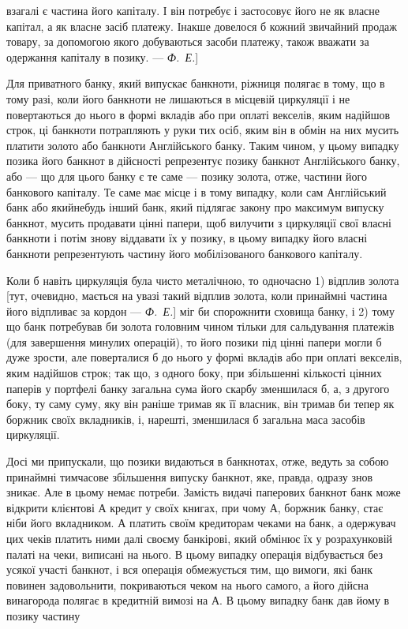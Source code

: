 \parcont{}  %
взагалі є частина його капіталу. І він потребує і застосовує його
не як власне капітал, а як власне засіб платежу. Інакше довелося
б кожний звичайний продаж товару, за допомогою якого
добуваються засоби платежу, також вважати за одержання капіталу
в позику. — \emph{Ф.~Е.}]

Для приватного банку, який випускає банкноти, ріжниця полягає
в тому, що в тому разі, коли його банкноти не лишаються
в місцевій циркуляції і не повертаються до нього в формі
вкладів або при оплаті векселів, яким надійшов строк, ці банкноти
потрапляють у руки тих осіб, яким він в обмін на них
мусить платити золото або банкноти Англійського банку.
Таким чином, у цьому випадку позика його банкнот в дійсності
репрезентує позику банкнот Англійського банку, або — що для
цього банку є те саме — позику золота, отже, частини його
банкового капіталу. Те саме має місце і в тому випадку, коли
сам Англійський банк або якийнебудь інший банк, який підлягає
закону про максимум випуску банкнот, мусить продавати
цінні папери, щоб вилучити з циркуляції свої власні банкноти
і потім знову віддавати їх у позику, в цьому випадку
його власні банкноти репрезентують частину його мобілізованого
банкового капіталу.

Коли б навіть циркуляція була чисто металічною, то одночасно
1) відплив золота [тут, очевидно, мається на увазі такий
відплив золота, коли принаймні частина його відпливає за кордон
— \emph{Ф.~Е.}] міг би спорожнити сховища банку, і 2) тому що
банк потребував би золота головним чином тільки для сальдування
платежів (для завершення минулих операцій), то його позики
під цінні папери могли б дуже зрости, але поверталися б до
нього у формі вкладів або при оплаті векселів, яким надійшов
строк; так що, з одного боку, при збільшенні кількості цінних
паперів у портфелі банку загальна сума його скарбу зменшилася
б, а, з другого боку, ту саму суму, яку він раніше тримав
як її власник, він тримав би тепер як боржник своїх вкладників,
і, нарешті, зменшилася б загальна маса засобів циркуляції.

Досі ми припускали, що позики видаються в банкнотах,
отже, ведуть за собою принаймні тимчасове збільшення випуску
банкнот, яке, правда, одразу знов зникає. Але в цьому
немає потреби. Замість видачі паперових банкнот банк може
відкрити клієнтові $А$ кредит у своїх книгах, при чому $А$, боржник
банку, стає ніби його вкладником. $А$ платить своїм кредиторам
чеками на банк, а одержувач цих чеків платить ними
далі своєму банкірові, який обмінює їх у розрахунковій палаті на
чеки, виписані на нього. В цьому випадку операція відбувається
без усякої участі банкнот, і вся операція обмежується тим, що
вимоги, які банк повинен задовольнити, покриваються чеком на
нього самого, а його дійсна винагорода полягає в кредитній вимозі
на $А$. В цьому випадку банк дав йому в позику частину
\parbreak{}  %
